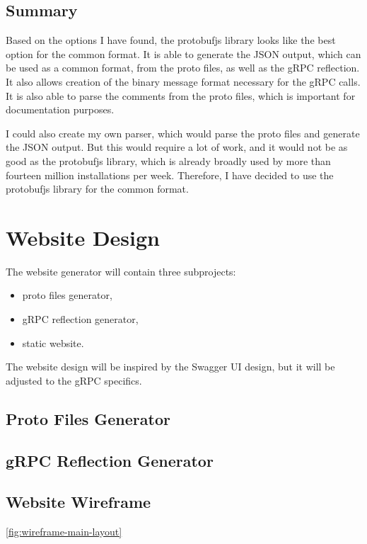 \subsection{Summary}

Based on the options I have found, the protobufjs library looks like the best option for the common format.
It is able to generate the JSON output, which can be used as a common format, from the proto files, as well as the gRPC reflection.
It also allows creation of the binary message format necessary for the gRPC calls.
It is also able to parse the comments from the proto files, which is important for documentation purposes.

I could also create my own parser, which would parse the proto files and generate the JSON output.
But this would require a lot of work, and it would not be as good as the protobufjs library, which is already broadly used by more than fourteen million installations per week.
Therefore, I have decided to use the protobufjs library for the common format.


\section{Website Design}
The website generator will contain three subprojects:
\begin{itemize}
    \item proto files generator,
    \item gRPC reflection generator,
    \item static website.
\end{itemize}

The website design will be inspired by the Swagger UI design, but it will be adjusted to the gRPC specifics.

\subsection{Proto Files Generator}

\subsection{gRPC Reflection Generator}

\subsection{Website Wireframe}
\ref{fig:wireframe-main-layout}

